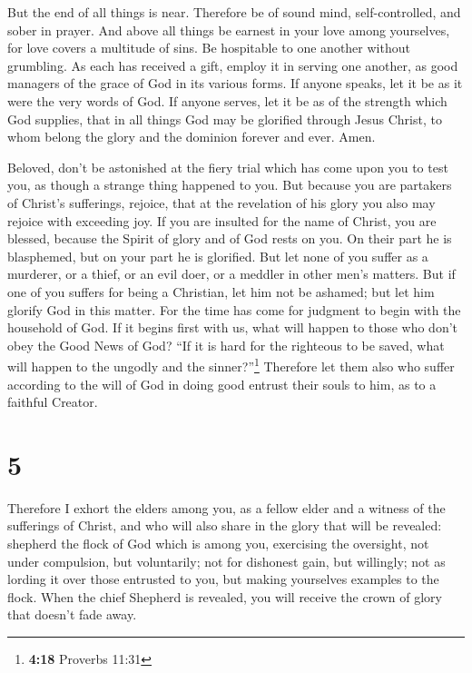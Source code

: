  But the end of all things is near. Therefore be of sound
mind, self-controlled, and sober in prayer.  And above all
things be earnest in your love among yourselves, for love covers a
multitude of sins.  Be hospitable to one another without
grumbling.  As each has received a gift, employ it in
serving one another, as good managers of the grace of God in its various
forms.  If anyone speaks, let it be as it were the very
words of God. If anyone serves, let it be as of the strength which God
supplies, that in all things God may be glorified through Jesus Christ,
to whom belong the glory and the dominion forever and ever. Amen.

 Beloved, don't be astonished at the fiery trial which
has come upon you to test you, as though a strange thing happened to
you.  But because you are partakers of Christ's
sufferings, rejoice, that at the revelation of his glory you also may
rejoice with exceeding joy.  If you are insulted for the
name of Christ, you are blessed, because the Spirit of glory and of God
rests on you. On their part he is blasphemed, but on your part he is
glorified.  But let none of you suffer as a murderer, or
a thief, or an evil doer, or a meddler in other men's matters.
 But if one of you suffers for being a Christian, let him
not be ashamed; but let him glorify God in this matter. 
For the time has come for judgment to begin with the household of God.
If it begins first with us, what will happen to those who don't obey the
Good News of God?  ``If it is hard for the righteous to
be saved, what will happen to the ungodly and the sinner?''\footnote{\textbf{4:18}
  Proverbs 11:31}  Therefore let them also who suffer
according to the will of God in doing good entrust their souls to him,
as to a faithful Creator.

\hypertarget{section-4}{%
\section{5}\label{section-4}}

 Therefore I exhort the elders among you, as a fellow
elder and a witness of the sufferings of Christ, and who will also share
in the glory that will be revealed:  shepherd the flock of
God which is among you, exercising the oversight, not under compulsion,
but voluntarily; not for dishonest gain, but willingly; 
not as lording it over those entrusted to you, but making yourselves
examples to the flock.  When the chief Shepherd is
revealed, you will receive the crown of glory that doesn't fade away.

